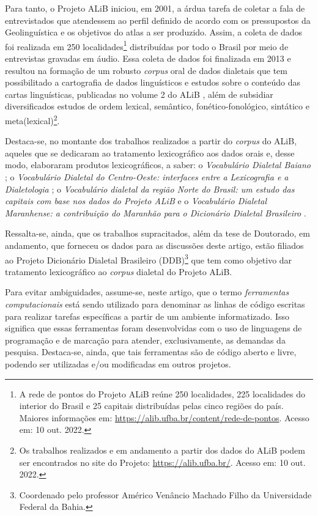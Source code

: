 \documentclass[portuguese]{textolivre}
\begin{document}
Para tanto, o Projeto ALiB iniciou, em 2001, a árdua tarefa de coletar a fala de entrevistados que atendessem ao perfil definido de acordo com os pressupostos da Geolinguística e os objetivos do atlas a ser produzido. Assim, a coleta de dados foi realizada em 250 localidades\footnote{A rede de pontos do Projeto ALiB reúne 250 localidades, 225 localidades do interior do Brasil e 25 capitais distribuídas pelas cinco regiões do país. Maiores informações em: \url{https://alib.ufba.br/content/rede-de-pontos}. Acesso em: 10 out. 2022.} distribuídas por todo o Brasil por meio de entrevistas gravadas em áudio. Essa coleta de dados foi finalizada em 2013 e resultou na formação de um robusto \emph{corpus} oral de dados dialetais que tem possibilitado a cartografia de dados linguísticos e estudos sobre o conteúdo das cartas linguísticas, publicadas no volume 2 do ALiB \cite{cardoso2014atlas}, além de subsidiar diversificados estudos de ordem lexical, semântico, fonético-fonológico, sintático e meta(lexical)\footnote{Os trabalhos realizados e em andamento a partir dos dados do ALiB podem ser encontrados no site do Projeto: \url{https://alib.ufba.br/}. Acesso em: 10 out. 2022.}. 

Destaca-se, no montante dos trabalhos realizados a partir do \textit{corpus} do ALiB, aqueles que se dedicaram ao tratamento lexicográfico aos dados orais e, desse modo, elaboraram produtos lexicográficos, a saber: o \emph{Vocabulário Dialetal Baiano} \cite{neiva2017}; o \emph{Vocabulário Dialetal do Centro-Oeste: interfaces entre a Lexicografia e a Dialetologia} \cite{costa2018};  o \emph{Vocabulário dialetal da região Norte do Brasil: um estudo das capitais com base nos dados do Projeto ALiB} \cite{correasousa2019vocabulario} e o \emph{Vocabulário Dialetal Maranhense: a contribuição do Maranhão para o Dicionário Dialetal Brasileiro} \cite{maramaldo2019}.

Ressalta-se, ainda, que os trabalhos supracitados, além da tese de Doutorado, em andamento, que forneceu os dados para as discussões deste artigo, estão filiados ao Projeto Dicionário Dialetal Brasileiro (DDB)\footnote{Coordenado pelo professor Américo Venâncio Machado Filho da Universidade Federal da Bahia.} \cite{machado2010ponto} que tem como objetivo dar tratamento lexicográfico ao \textit{corpus} dialetal do Projeto ALiB.

Para evitar ambiguidades, assume-se, neste artigo, que o termo \emph{ferramentas computacionais} está sendo utilizado para denominar as linhas de código escritas para realizar tarefas específicas a partir de um ambiente informatizado. Isso significa que essas ferramentas foram desenvolvidas com o uso de linguagens de programação e de marcação para atender, exclusivamente, as demandas da pesquisa. Destaca-se, ainda, que tais ferramentas são de código aberto e livre, podendo ser utilizadas e/ou modificadas em outros projetos.
\end{document}

